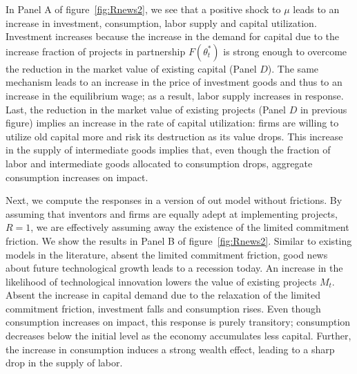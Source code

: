 \documentclass[12pt]{article}
\begin{document}
In Panel A of figure~\ref{fig:Rnews2}, we see that a positive shock to $\mu$ leads to an increase in investment, consumption, labor supply and capital utilization. Investment increases because the increase in the demand for capital due to the increase fraction of projects in partnership  $F(\theta_t^*)$ is strong enough to overcome the reduction in the market value of existing capital (Panel $D$). The same mechanism leads to an increase in the price of investment goods and thus to an increase in the equilibrium wage; as a result, labor supply increases in response. Last, the reduction in the market value of existing projects (Panel $D$ in previous figure) implies an increase in the rate of capital utilization: firms are willing to utilize old capital more and risk its destruction as its value drops. This increase in the supply of intermediate goods implies that, even though the fraction of labor and intermediate goods allocated to consumption drops, aggregate consumption increases on impact.





Next, we compute the responses in a version of out model without frictions. By assuming that inventors and firms are equally adept at implementing projects,  $R=1$, we are effectively assuming away the existence of the limited commitment friction.  We show the results in Panel B of figure~\ref{fig:Rnews2}. Similar to existing models in the literature, absent the limited commitment friction,  good news about future technological growth  leads to a recession today. An increase in the likelihood of technological innovation lowers the value of existing projects $M_t$. Absent the increase in capital demand due to the relaxation of the limited commitment friction, investment falls and consumption rises. Even though consumption increases on impact, this response is purely transitory; consumption decreases below the initial level as the economy accumulates less capital.  Further, the increase in consumption induces a strong wealth effect, leading to a sharp drop in the supply of labor.
\end{document}
